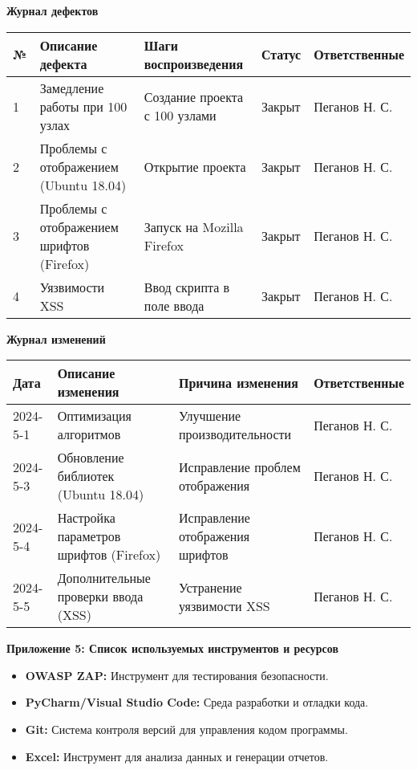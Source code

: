 \documentclass{article}
\newcommand\zz[1]{\par{\normalsize\strut #1} \hfill\ignorespaces}
\begin{document}
\begin{itemize}
    \textbf{Журнал дефектов}

    \begin{center}
        \begin{tabular}{|l|l|l|l|l|}
            \hline
            № & Описание дефекта & Шаги воспроизведения & Статус & Ответственные \\
            \hline
            1 & Замедление работы при 100 узлах & Создание проекта с 100 узлами & Закрыт & Пеганов Н. С. \\
            \hline
            2 & Проблемы с отображением (Ubuntu 18.04) & Открытие проекта & Закрыт & Пеганов Н. С. \\
            \hline
            3 & Проблемы с отображением шрифтов (Firefox) & Запуск на Mozilla Firefox & Закрыт & Пеганов Н. С. \\
            \hline
            4 & Уязвимости XSS & Ввод скрипта в поле ввода & Закрыт & Пеганов Н. С. \\
            \hline
        \end{tabular}
    \end{center}

    \textbf{Журнал изменений}

    \begin{center}
        \begin{tabular}{|l|l|l|l|}
            \hline
            Дата & Описание изменения & Причина изменения & Ответственные \\
            \hline
            2024-5-1 & Оптимизация алгоритмов & Улучшение производительности & Пеганов Н. С. \\
            \hline
            2024-5-3 & Обновление библиотек (Ubuntu 18.04) & Исправление проблем отображения & Пеганов Н. С. \\
            \hline
            2024-5-4 & Настройка параметров шрифтов (Firefox) & Исправление отображения шрифтов & Пеганов Н. С. \\
            \hline
            2024-5-5 & Дополнительные проверки ввода (XSS) & Устранение уязвимости XSS & Пеганов Н. С. \\
            \hline
        \end{tabular}
    \end{center}

    \zz{}\textbf{Приложение 5: Список используемых инструментов и ресурсов}

    \begin{itemize}
        \item \textbf{OWASP ZAP:} Инструмент для тестирования безопасности.
        \item \textbf{PyCharm/Visual Studio Code:} Среда разработки и отладки кода.
        \item \textbf{Git:} Система контроля версий для управления кодом программы.
        \item \textbf{Excel:} Инструмент для анализа данных и генерации отчетов.
    \end{itemize}


\end{itemize}
\end{document}
